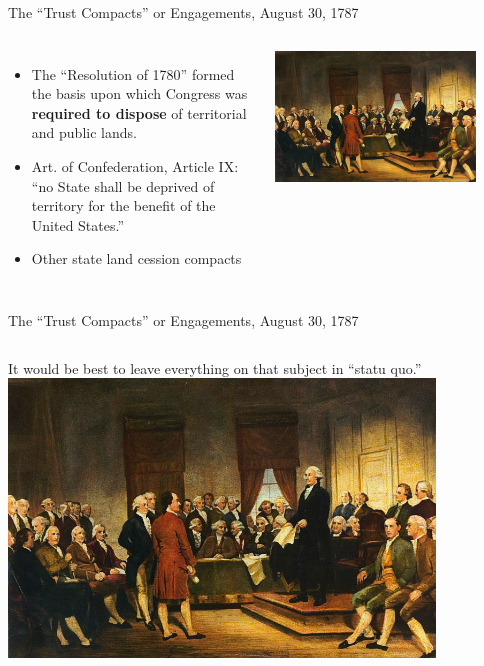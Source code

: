 \begin{frame}{The ``Trust Compacts'' or Engagements, August 30, 1787}
    \begin{columns}[onlytextwidth]
            \vspace{10pt}
            \begin{itemize}
                \item The ``Resolution of 1780'' formed the basis upon which Congress was \textbf{required to dispose} of territorial and public lands.
                \item Art. of Confederation, Article IX: ``no State shall be deprived of territory for the benefit of the United States.''
                \item Other state land cession compacts
            \end{itemize}
            \centering
            \includegraphics[width=0.85\textwidth]{img/convention.png} \\
    \end{columns}
\end{frame}

\begin{frame}{The ``Trust Compacts'' or Engagements, August 30, 1787}
    \begin{columns}[onlytextwidth]
            { \Large It would be best to leave everything on that subject in ``statu quo.'' }
            \centering
            \includegraphics[width=0.85\textwidth]{img/convention.png} \\
    \end{columns}
\end{frame}

